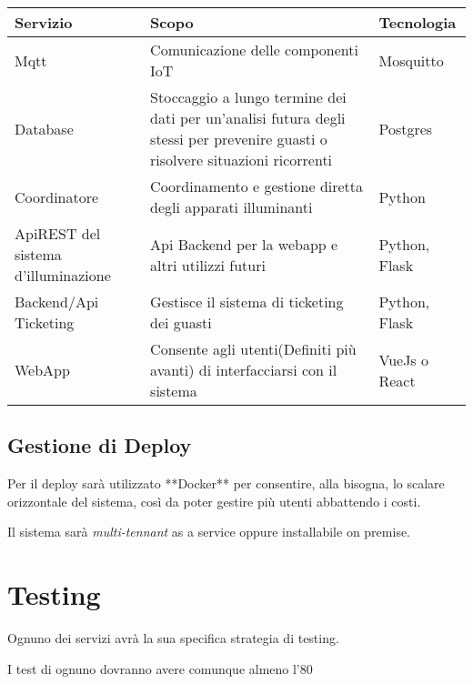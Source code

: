 \begin{center}
    \begin{tabularx}{14cm}{|X|X| X|}
        \hline
        Servizio & Scopo & Tecnologia\\
        \hline        
        Mqtt& Comunicazione delle componenti IoT  &Mosquitto\\
        \hline 
        Database & Stoccaggio a lungo termine dei dati per un'analisi futura degli stessi per prevenire guasti o risolvere situazioni ricorrenti & Postgres\\
        \hline 
        Coordinatore &Coordinamento e gestione diretta degli apparati illuminanti& Python\\
        \hline 
        ApiREST del sistema d'illuminazione&Api Backend per la webapp e altri utilizzi futuri&Python, Flask\\
        \hline
        Backend/Api Ticketing&Gestisce il sistema di ticketing dei guasti&Python, Flask\\
        \hline
        WebApp&Consente agli utenti(Definiti più avanti) di interfacciarsi con il sistema&VueJs o React\\
        \hline
    \end{tabularx}
\end{center}





\subsection{Gestione di Deploy}

Per il deploy sarà utilizzato **Docker** per consentire, alla bisogna, lo scalare orizzontale del sistema, così da poter gestire più utenti abbattendo i costi.
        
Il sistema sarà \textit{multi-tennant} as a service oppure installabile on premise.

\section{Testing}

Ognuno dei servizi avrà la sua specifica strategia di testing.

I test di ognuno dovranno avere comunque almeno l'80%
